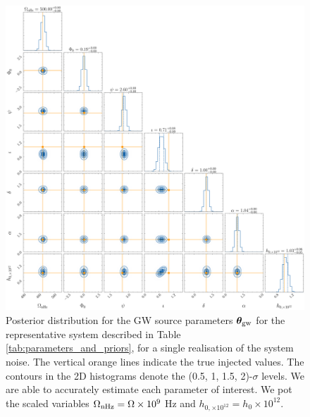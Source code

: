 \documentclass[fleqn,usenatbib,useAMS]{mnras}
\begin{document}
 
\begin{figure}
	\includegraphics[width=\textwidth, height =\textwidth ]{images/representative_example_v2_GW}
	\caption{Posterior distribution for the GW source parameters $\boldsymbol{\theta}_{\rm gw}$ for the representative system described in Table \ref{tab:parameters_and_priors}, for a single realisation of the system noise. The vertical orange lines indicate the true injected values. The contours in the 2D histograms denote the (0.5, 1, 1.5, 2)-$\sigma$ levels. We are able to accurately estimate each parameter of interest. We pot the scaled variables $\Omega_{\rm nHz} = \Omega \times 10^{9}$ Hz and $h_{0, \times 10^{12}} = h_0 \times 10^{12}$.}
	\label{fig:corner_plot_1}
\end{figure}
\end{document}
